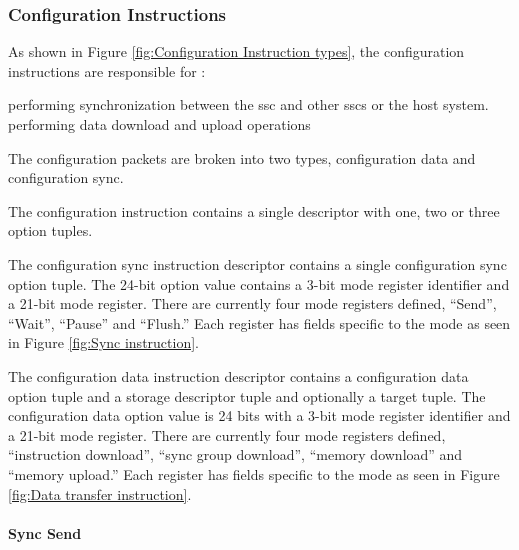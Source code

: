 \subsubsection{Configuration Instructions}
\label{sec:Decoding Configuration Instructions}

As shown in Figure \ref{fig:Configuration Instruction types}, the configuration instructions are responsible for :
\begin{outline}
 \1 performing synchronization between the \ac{ssc} and other \acp{ssc} or the host system.
 \1 performing data download and upload operations
\end{outline}

The configuration packets are broken into two types, configuration data and configuration sync.
\iffalse
Currently the sync instruction has been implemented.
It is assumed at this point that adequate infrastructure and extensibility has been built into the system to allow implementation without adding significant amounts of logic.
\fi

The configuration instruction contains a single descriptor with one, two or three option tuples.

The configuration sync instruction descriptor contains a single configuration sync option tuple. The 24-bit option value contains a 3-bit mode register identifier and a 21-bit mode register.
There are currently four mode registers defined, ``Send'', ``Wait'', ``Pause'' and ``Flush.'' Each register has fields specific to the mode as seen in Figure \ref{fig:Sync instruction}.

The configuration data instruction descriptor contains a configuration data option tuple and a storage descriptor tuple and optionally a target tuple. 
The configuration data option value is 24 bits with a 3-bit mode register identifier and a 21-bit mode register.
There are currently four mode registers defined, ``instruction download'', ``sync group download'', ``memory download'' and ``memory upload.''   Each register has fields specific to the mode as seen in Figure \ref{fig:Data transfer instruction}.

\paragraph{Sync Send}

